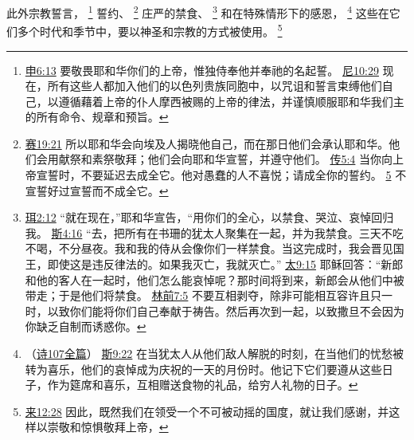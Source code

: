\documentclass[12pt, a4paper, oneside]{ctexart}
\begin{document}
	此外宗教誓言，
	\footnote {
		\href{https://biblehub.com/deuteronomy/6-13.htm}{申6:13} 要敬畏耶和华你们的上帝，惟独侍奉他并奉祂的名起誓。
		\href{https://biblehub.com/nehemiah/10-29.htm}{尼10:29} 现在，所有这些人都加入他们的以色列贵族同胞中，以咒诅和誓言束缚他们自己，以遵循藉着上帝的仆人摩西被赐的上帝的律法，并谨慎顺服耶和华我们主的所有命令、规章和预旨。
	}
	誓约、
	\footnote {
		\href{https://biblehub.com/isaiah/19-21.htm}{赛19:21} 所以耶和华会向埃及人揭晓他自己，而在那日他们会承认耶和华。他们会用献祭和素祭敬拜；他们会向耶和华宣誓，并遵守他们。
		\href{https://biblehub.com/ecclesiastes/5-4.htm}{传5:4} 当你向上帝宣誓时，不要延迟去成全它。他对愚蠢的人不喜悦；请成全你的誓约。
		\href{https://biblehub.com/ecclesiastes/5-5.htm}{5} 不宣誓好过宣誓而不成全它。
	}
	庄严的禁食、
	\footnote {
		\href{https://biblehub.com/joel/2-12.htm}{珥2:12} “就在现在，”耶和华宣告，“用你们的全心，以禁食、哭泣、哀悼回归我。
		\href{https://biblehub.com/esther/4-16.htm}{斯4:16} “去，把所有在书珊的犹太人聚集在一起，并为我禁食。三天不吃不喝，不分昼夜。我和我的侍从会像你们一样禁食。当这完成时，我会晋见国王，即使这是违反律法的。如果我灭亡，我就灭亡。”
		\href{https://biblehub.com/matthew/9-15.htm}{太9:15} 耶稣回答：“新郎和他的客人在一起时，他们怎么能哀悼呢？那时间将到来，新郎会从他们中被带走；于是他们将禁食。
		\href{https://biblehub.com/1_corinthians/7-5.htm}{林前7:5} 不要互相剥夺，除非可能相互容许且只一时，以致你们能将你们自己奉献于祷告。然后再次到一起，以致撒旦不会因为你缺乏自制而诱惑你。
	}
	和在特殊情形下的感恩，
	\footnote {
		（\href{https://biblehub.com/niv/psalms/107.htm}{诗107全篇}）
		\href{https://biblehub.com/esther/9-22.htm}{斯9:22} 在当犹太人从他们敌人解脱的时刻，在当他们的忧愁被转为喜乐，他们的哀悼成为庆祝的一天的月份时。他记下它们要遵从这些日子，作为筵席和喜乐，互相赠送食物的礼品，给穷人礼物的日子。
	}
	这些在它们多个时代和季节中，要以神圣和宗教的方式被使用。
	\footnote {
		\href{https://biblehub.com/hebrews/12-28.htm}{来12:28} 因此，既然我们在领受一个不可被动摇的国度，就让我们感谢，并这样以崇敬和惊惧敬拜上帝，
	}
\end{document}
